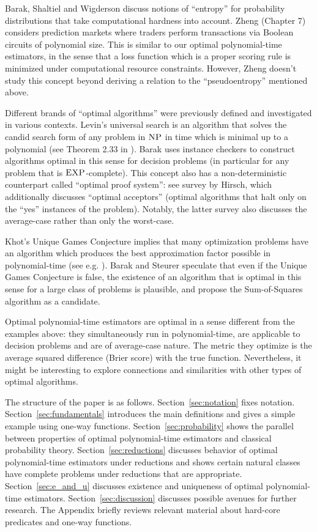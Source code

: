 \documentclass[11pt]{article}
\numberwithin{equation}{section}
\theoremstyle{definition}
\theoremstyle{plain}
\begin{document}
Barak, Shaltiel and Wigderson \cite{Barak_2003} discuss notions of \enquote{entropy} for probability distributions that take computational hardness into account. Zheng \cite{Zheng_2014} (Chapter 7) considers prediction markets where traders perform transactions via Boolean circuits of polynomial size. This is similar to our optimal polynomial-time estimators, in the sense that a loss function which is a proper scoring rule is minimized under computational resource constraints. However, Zheng doesn't study this concept beyond deriving a relation to the \enquote{pseudoentropy} mentioned above.

Different brands of \enquote{optimal algorithms} were previously defined and investigated in various contexts. Levin's universal search is an algorithm that solves the candid search form of any problem in ${\textsc{NP}}$ in time which is minimal up to a polynomial (see Theorem 2.33 in \cite{Goldreich_2008}). Barak\cite{Barak_2002} uses instance checkers to construct algorithms optimal in this sense for decision problems (in particular for any problem that is ${\textsc{EXP}}$-complete). This concept also has a non-deterministic counterpart called \enquote{optimal proof system}: see survey by Hirsch\cite{Hirsch_2010}, which additionally discusses \enquote{optimal acceptors} (optimal algorithms that halt only on the \enquote{yes} instances of the problem). Notably, the latter survey also discusses the average-case rather than only the worst-case.

Khot's Unique Games Conjecture implies that many optimization problems have an algorithm which produces the best approximation factor possible in polynomial-time (see e.g. \cite{Khot_2010}). Barak and Steurer \cite{Barak_2014} speculate that even if the Unique Games Conjecture is false, the existence of an algorithm that is optimal in this sense for a large class of problems is plausible, and propose the Sum-of-Squares algorithm as a candidate.

Optimal polynomial-time estimators are optimal in a sense different from the examples above: they simultaneously run in polynomial-time, are applicable to decision problems and are of average-case nature. The metric they optimize is the average squared difference (Brier score) with the true function. Nevertheless, it might be interesting to explore connections and similarities with other types of optimal algorithms.\newline

The structure of the paper is as follows. Section~\ref{sec:notation} fixes notation. Section~\ref{sec:fundamentals} introduces the main definitions and gives a simple example using one-way functions. Section~\ref{sec:probability} shows the parallel between properties of optimal polynomial-time estimators and classical probability theory. Section~\ref{sec:reductions} discusses behavior of optimal polynomial-time estimators under reductions and shows certain natural classes have complete problems under reductions that are appropriate. Section~\ref{sec:e_and_u} discusses existence and uniqueness of optimal polynomial-time estimators. Section~\ref{sec:discussion} discusses possible avenues for further research. The Appendix briefly reviews relevant material about hard-core predicates and one-way functions.
\end{document}
